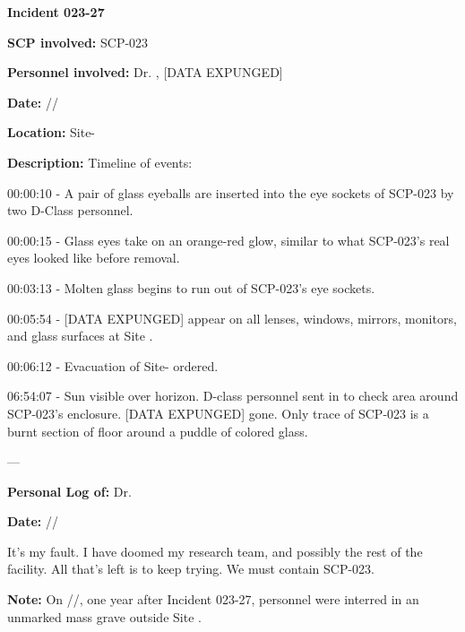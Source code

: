 \textbf{Incident 023-27}

\textbf{SCP involved:} SCP-023

\textbf{Personnel involved:} Dr. , [DATA EXPUNGED]

\textbf{Date:} //

\textbf{Location:} Site-

\textbf{Description:} Timeline of events:

00:00:10 - A pair of glass eyeballs are inserted into the eye sockets of SCP-023 by two D-Class personnel.

00:00:15 - Glass eyes take on an orange-red glow, similar to what SCP-023's real eyes looked like before removal.

00:03:13 - Molten glass begins to run out of SCP-023's eye sockets.

00:05:54 - [DATA EXPUNGED] appear on all lenses, windows, mirrors, monitors, and glass surfaces at Site .

00:06:12 - Evacuation of Site- ordered.

06:54:07 - Sun visible over horizon. D-class personnel sent in to check area around SCP-023's enclosure. [DATA EXPUNGED] gone. Only trace of SCP-023 is a burnt section of floor around a puddle of colored glass.

---

\textbf{Personal Log of:} Dr. 

\textbf{Date:} //

It's my fault. I have doomed my research team, and possibly the rest of the facility. All that's left is to keep trying. We must contain SCP-023.

\textbf{Note:} On //, one year after Incident 023-27,  personnel were interred in an unmarked mass grave outside Site .